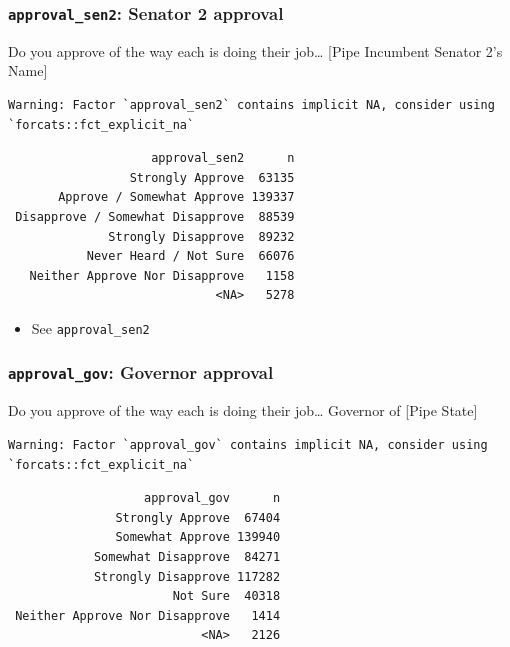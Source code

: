 \documentclass[10pt,article,oneside]{memoir}
\theoremstyle{definition}
\begin{document}
\hypertarget{approval_sen2-senator-2-approval}{%
\subsubsection{\texorpdfstring{\texttt{approval\_sen2}: Senator 2
approval}{approval\_sen2: Senator 2 approval}}\label{approval_sen2-senator-2-approval}}

Do you approve of the way each is doing their job\ldots{} {[}Pipe
Incumbent Senator 2's Name{]}

\begin{verbatim}
Warning: Factor `approval_sen2` contains implicit NA, consider using
`forcats::fct_explicit_na`
\end{verbatim}

\begin{verbatim}
                    approval_sen2      n
                 Strongly Approve  63135
       Approve / Somewhat Approve 139337
 Disapprove / Somewhat Disapprove  88539
              Strongly Disapprove  89232
           Never Heard / Not Sure  66076
   Neither Approve Nor Disapprove   1158
                             <NA>   5278
\end{verbatim}

\begin{itemize}
\tightlist
\item
  See \texttt{approval\_sen2}
\end{itemize}

\hypertarget{approval_gov-governor-approval}{%
\subsubsection{\texorpdfstring{\texttt{approval\_gov}: Governor
approval}{approval\_gov: Governor approval}}\label{approval_gov-governor-approval}}

Do you approve of the way each is doing their job\ldots{} Governor of
{[}Pipe State{]}

\begin{verbatim}
Warning: Factor `approval_gov` contains implicit NA, consider using
`forcats::fct_explicit_na`
\end{verbatim}

\begin{verbatim}
                   approval_gov      n
               Strongly Approve  67404
               Somewhat Approve 139940
            Somewhat Disapprove  84271
            Strongly Disapprove 117282
                       Not Sure  40318
 Neither Approve Nor Disapprove   1414
                           <NA>   2126
\end{verbatim}
\end{document}
